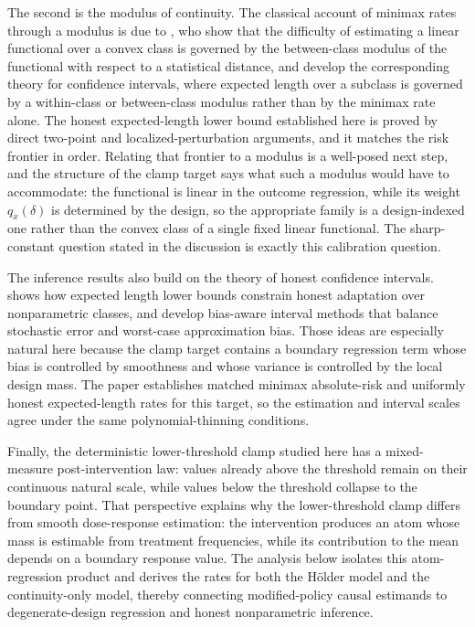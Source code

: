 The second is the modulus of continuity.  The classical account of minimax rates through a modulus is due to \citet{DonohoLiu1991GeometrizingII}, who show that the difficulty of estimating a linear functional over a convex class is governed by the between-class modulus of the functional with respect to a statistical distance, and \citet{CaiLow2004AdaptationTheory} develop the corresponding theory for confidence intervals, where expected length over a subclass is governed by a within-class or between-class modulus rather than by the minimax rate alone.  The honest expected-length lower bound established here is proved by direct two-point and localized-perturbation arguments, and it matches the risk frontier in order.  Relating that frontier to a modulus is a well-posed next step, and the structure of the clamp target says what such a modulus would have to accommodate: the functional is linear in the outcome regression, while its weight \(q_x(\delta)\) is determined by the design, so the appropriate family is a design-indexed one rather than the convex class of a single fixed linear functional.  The sharp-constant question stated in the discussion is exactly this calibration question.

The inference results also build on the theory of honest confidence intervals. \citet{Low1997NonparametricConfidenceIntervals} shows how expected length lower bounds constrain honest adaptation over nonparametric classes, and \citet{ArmstrongKolesar2018OptimalInference,ArmstrongKolesar2020} develop bias-aware interval methods that balance stochastic error and worst-case approximation bias. Those ideas are especially natural here because the clamp target contains a boundary regression term whose bias is controlled by smoothness and whose variance is controlled by the local design mass. The paper establishes matched minimax absolute-risk and uniformly honest expected-length rates for this target, so the estimation and interval scales agree under the same polynomial-thinning conditions.

Finally, the deterministic lower-threshold clamp studied here has a mixed-measure post-intervention law: values already above the threshold remain on their continuous natural scale, while values below the threshold collapse to the boundary point. That perspective explains why the lower-threshold clamp differs from smooth dose-response estimation: the intervention produces an atom whose mass is estimable from treatment frequencies, while its contribution to the mean depends on a boundary response value. The analysis below isolates this atom-regression product and derives the rates for both the Hölder model and the continuity-only model, thereby connecting modified-policy causal estimands to degenerate-design regression and honest nonparametric inference.
